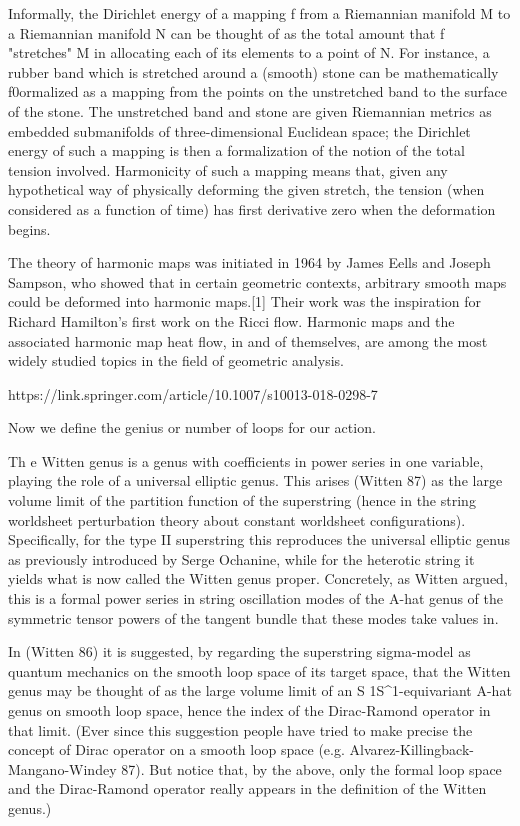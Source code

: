 Informally, the Dirichlet energy of a mapping f from a Riemannian manifold M to a Riemannian manifold N
 can be thought of as the total amount that f "stretches" M in allocating each of its elements to a point of N. 
 For instance, a rubber band which is stretched around a (smooth) stone can be mathematically f0ormalized as a mapping from the points on the unstretched band to the surface of the stone. The unstretched band and stone are given Riemannian metrics as embedded submanifolds of three-dimensional Euclidean space; the Dirichlet energy of such a mapping is then a formalization of the notion of the total tension involved. Harmonicity of such a mapping means that, given any hypothetical way of physically deforming the given stretch, the tension (when considered as a function of time) has first derivative zero when the deformation begins.

The theory of harmonic maps was initiated in 1964 by James Eells 
and Joseph Sampson, who showed that in certain geometric contexts, 
arbitrary smooth maps could be deformed into harmonic maps.[1] Their
 work was the inspiration for Richard Hamilton's first work on the Ricci
  flow. Harmonic maps and the associated harmonic map heat flow, in and
   of themselves, are among the most widely studied topics in the field of geometric analysis. 


https://link.springer.com/article/10.1007/s10013-018-0298-7

Now we define the genius or number of loops for our action.

Th                                         
e Witten genus is a genus with coefficients in power series in one variable, playing the role of a universal elliptic genus. 
This arises (Witten 87) as the large volume limit of the partition function of the superstring (hence in the string worldsheet 
perturbation theory about constant worldsheet configurations). Specifically, for the type II superstring this reproduces the universal 
	elliptic genus as previously introduced by Serge Ochanine, while for the heterotic string it yields what is now called the Witten genus proper. Concretely, as Witten argued, this is a formal power series in string oscillation modes of the A-hat genus of the symmetric tensor powers of the tangent bundle that these modes take values in.


In (Witten 86) it is suggested, by regarding the superstring sigma-model as quantum mechanics on the smooth loop space of its target space, that the Witten genus may be thought of as the large volume limit of an S 1S^1-equivariant A-hat genus on smooth loop space, hence the index of the Dirac-Ramond operator in that limit. (Ever since this suggestion people have tried to make precise the concept of Dirac operator on a smooth loop space (e.g. Alvarez-Killingback-Mangano-Windey 87). But notice that, by the above, only the formal loop space and the Dirac-Ramond operator really appears in the definition of the Witten genus.)

